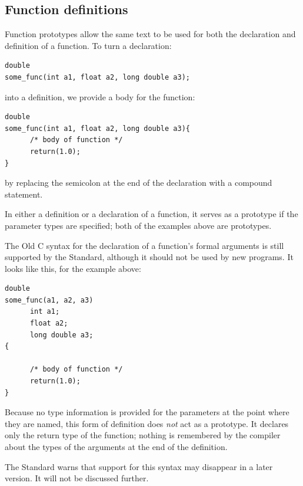   

  \subsection{Function definitions}
   

   Function prototypes allow the same text to be used for both the
    declaration and definition of a function. To turn a declaration:

\begin{Verbatim}
double
some_func(int a1, float a2, long double a3);
\end{Verbatim}

   into a definition, we provide a body for the function:

\begin{Verbatim}
double
some_func(int a1, float a2, long double a3){
      /* body of function */
      return(1.0);
}
\end{Verbatim}

   by replacing the semicolon at the end of the declaration with a
    compound statement.


   In either a definition or a declaration of a function, it serves as a
    prototype if the parameter types are specified; both of the examples
    above are prototypes.


   The Old C syntax for the declaration of a function's formal arguments
    is still supported by the Standard, although it should not be used by
    new programs. It looks like this, for the example above:

\begin{Verbatim}
double
some_func(a1, a2, a3)
      int a1;
      float a2;
      long double a3;
{

      /* body of function */
      return(1.0);
}
\end{Verbatim}

   Because no type information is provided for the parameters at the
    point where they are named, this form of definition does \textit{not}
    act as a prototype. It declares only the return type of the function;
    nothing is remembered by the compiler about the types of the arguments
    at the end of the definition.


   The Standard warns that support for this syntax may disappear in a
    later version. It will not be discussed further.


